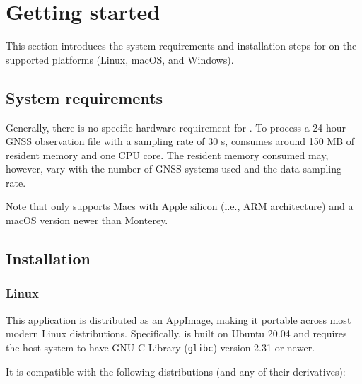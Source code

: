 \section{Getting started}

This section introduces the system requirements and installation steps for \pppx{}
on the supported platforms (Linux, macOS, and Windows).




\subsection{System requirements}

Generally, there is no specific hardware requirement for \pppx{}.
To process a 24-hour GNSS observation file with a sampling rate of 30 s,
\pppx{} consumes around 150 MB of resident memory and one CPU core.
The resident memory consumed may, however, vary with the number of GNSS systems used
and the data sampling rate.

Note that \pppx{} only supports Macs with Apple silicon (i.e., ARM architecture)
and a macOS version newer than Monterey.



\subsection{Installation}

\subsubsection{Linux}
\label{sec:installation_linux}

This application is distributed as an \href{https://appimage.org/}{AppImage},
making it portable across most modern Linux distributions.
Specifically, \pppx{} is built on Ubuntu 20.04 and requires the host system
to have GNU C Library (\texttt{glibc}) version 2.31 or newer.

It is compatible with the following distributions (and any of their derivatives):

